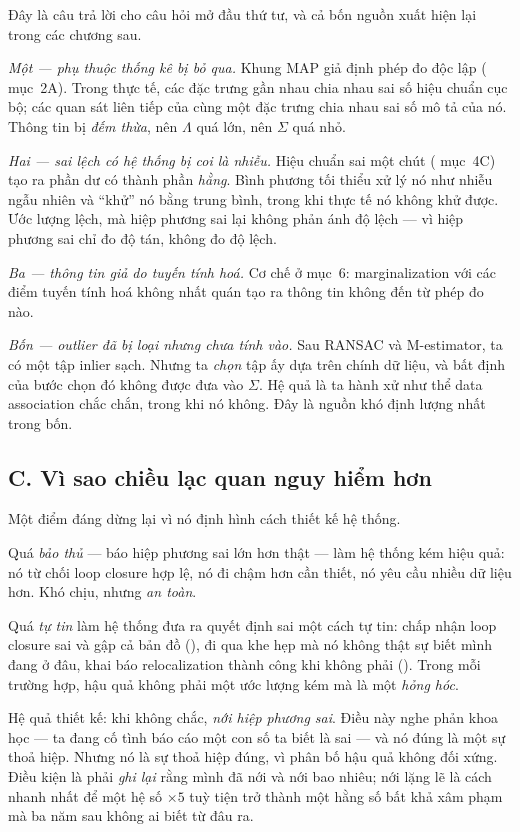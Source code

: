 \documentclass[../../vslam.tex]{subfiles}
\begin{document}
Đây là câu trả lời cho câu hỏi mở đầu thứ tư, và cả bốn nguồn xuất hiện lại trong các chương sau.

\emph{Một --- phụ thuộc thống kê bị bỏ qua.} Khung MAP giả định phép đo độc lập ( mục~2A). Trong thực tế, các đặc trưng gần nhau chia nhau sai số hiệu chuẩn cục bộ; các quan sát liên tiếp của cùng một đặc trưng chia nhau sai số mô tả của nó. Thông tin bị \emph{đếm thừa}, nên \(\Lambda\) quá lớn, nên \(\Sigma\) quá nhỏ.

\emph{Hai --- sai lệch có hệ thống bị coi là nhiễu.} Hiệu chuẩn sai một chút ( mục~4C) tạo ra phần dư có thành phần \emph{hằng}. Bình phương tối thiểu xử lý nó như nhiễu ngẫu nhiên và ``khử'' nó bằng trung bình, trong khi thực tế nó không khử được. Ước lượng lệch, mà hiệp phương sai lại không phản ánh độ lệch --- vì hiệp phương sai chỉ đo độ tán, không đo độ lệch.

\emph{Ba --- thông tin giả do tuyến tính hoá.} Cơ chế ở  mục~6: marginalization với các điểm tuyến tính hoá không nhất quán tạo ra thông tin không đến từ phép đo nào.

\emph{Bốn --- outlier đã bị loại nhưng chưa tính vào.} Sau RANSAC và M-estimator, ta có một tập inlier sạch. Nhưng ta \emph{chọn} tập ấy dựa trên chính dữ liệu, và bất định của bước chọn đó không được đưa vào \(\Sigma\). Hệ quả là ta hành xử như thể data association chắc chắn, trong khi nó không. Đây là nguồn khó định lượng nhất trong bốn.

\subsection{C. Vì sao chiều lạc quan nguy hiểm hơn}

Một điểm đáng dừng lại vì nó định hình cách thiết kế hệ thống.

Quá \emph{bảo thủ} --- báo hiệp phương sai lớn hơn thật --- làm hệ thống kém hiệu quả: nó từ chối loop closure hợp lệ, nó đi chậm hơn cần thiết, nó yêu cầu nhiều dữ liệu hơn. Khó chịu, nhưng \emph{an toàn}.

Quá \emph{tự tin} làm hệ thống đưa ra quyết định sai một cách tự tin: chấp nhận loop closure sai và gập cả bản đồ (), đi qua khe hẹp mà nó không thật sự biết mình đang ở đâu, khai báo relocalization thành công khi không phải (). Trong mỗi trường hợp, hậu quả không phải một ước lượng kém mà là một \emph{hỏng hóc}.

Hệ quả thiết kế: khi không chắc, \emph{nới hiệp phương sai}. Điều này nghe phản khoa học --- ta đang cố tình báo cáo một con số ta biết là sai --- và nó đúng là một sự thoả hiệp. Nhưng nó là sự thoả hiệp đúng, vì phân bố hậu quả không đối xứng. Điều kiện là phải \emph{ghi lại} rằng mình đã nới và nới bao nhiêu; nới lặng lẽ là cách nhanh nhất để một hệ số \(\times 5\) tuỳ tiện trở thành một hằng số bất khả xâm phạm mà ba năm sau không ai biết từ đâu ra.
\end{document}

